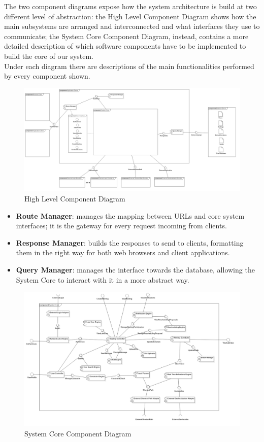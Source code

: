 The two component diagrams expose how the system architecture is build at two different level of abstraction: the High Level Component Diagram shows how the main subsystems are arranged and interconnected and what interfaces they use to communicate; the System Core Component Diagram, instead, contains a more detailed description of which software components have to be implemented to build the core of our system.\\
Under each diagram there are descriptions of the main functionalities performed by every component shown.

\begin{figure}[!h]
\centering\includegraphics[width=\textwidth]{Images/UMLDiagrams/HighLevelComponentDiagram.png}
\caption{High Level Component Diagram}
\end{figure}

\begin{itemize}
\item \textbf{Route Manager}: manages the mapping between URLs and core system interfaces; it is the gateway for every request incoming from clients.
\item \textbf{Response Manager}: builds the responses to send to clients, formatting them in the right way for both web browsers and client applications.
\item \textbf{Query Manager}: manages the interface towards the database, allowing the System Core to interact with it in a more abstract way.
\end{itemize}

\begin{figure}[H]
\centering\includegraphics[width=\textwidth]{Images/UMLDiagrams/ApplicationComponentDiagram.png}
\caption{System Core Component Diagram}
\end{figure}


